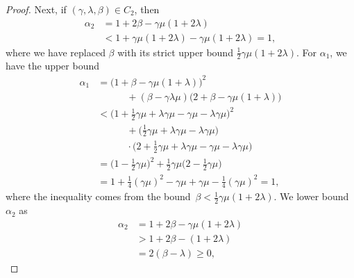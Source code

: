 \documentclass[10pt,a4paper]{amsart}
\newcommand{\V}{\ensuremath{\mathcal{V}}\xspace}
\newcommand{\X}{\ensuremath{\mathcal{X}}\xspace}
\begin{document}
\begin{proof}
    Next, if $(\gamma,\lambda,\beta)\in C_2$, then
    \begin{align}
        \alpha_2 &= 1+2\beta-\gamma\mu(1+2\lambda)
        \\ &< 1 +\gamma\mu(1+2\lambda) - \gamma\mu(1+2\lambda)=1,
    \end{align}
    where we have replaced $\beta$ with its strict upper bound $\frac{1}{2}\gamma\mu(1+2\lambda)$.
    For $\alpha_1$, we have the upper bound
    \begin{align}
        \alpha_1 &= \big(1+\beta-\gamma\mu(1+\lambda)\big)^2 
        \\ &\quad\quad\quad +  (\beta-\gamma\lambda\mu)\big(2+\beta-\gamma\mu(1+\lambda)\big)
        \\ &< \big(1 +\frac{1}{2}\gamma\mu+\lambda \gamma\mu -\gamma\mu-\lambda\gamma\mu\big)^2
        \\ &\quad\quad\quad + \big( \frac{1}{2}\gamma\mu+\lambda\gamma\mu-\lambda\gamma\mu\big)
        \\ & \quad\quad\quad \cdot\big(2 + \frac{1}{2}\gamma\mu+\lambda \gamma\mu - \gamma\mu-\lambda\gamma\mu\big)
        \\ &= \big( 1- \frac{1}{2}\gamma\mu\big)^2+ \frac{1}{2}\gamma\mu\big(2-\frac{1}{2}\gamma\mu\big)
        \\ &= 1 + \frac{1}{4}(\gamma\mu)^2 -\gamma\mu+\gamma\mu - \frac{1}{4}(\gamma\mu)^2=1,
    \end{align}
    where the inequality comes from the bound~$\beta<\frac{1}{2}\gamma\mu(1+2\lambda)$.
    We lower bound $\alpha_2$ as    
    \begin{align}
        \alpha_2 &= 1 + 2\beta-\gamma\mu(1+2\lambda)
            \\ &> 1+ 2\beta-(1+2\lambda)
            \\ &= 2(\beta-\lambda)\geq0,
    \end{align}

\end{proof}
\end{document}
